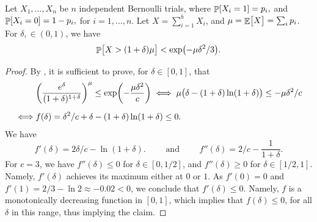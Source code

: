 \begin{fragment}{}
    \begin{lemma}
        Let $X_1, \ldots, X_n$ be $n$ independent Bernoulli trials, where
        \begin{math}
            \Prob{  X_i = 1 } =p_i,
        \end{math}
        and
        \begin{math}
            \Prob{  X_i = 0 } =1- p_i,
        \end{math}
        for $i=1,\ldots, n$.  Let $X = \sum_{i=1}^{b} X_i$, and
        $\mu = \mathop{\mathbb{E}}\!\left[ {\bigl. X} \right] = \sum_i p_i$.  For $\delta, \in (0,1)$,
        we have
        \begin{equation*}
            \Prob{ \bigl. X > (1+\delta)\mu } < \exp \pth{-\mu \delta^2 /
               3}.
        \end{equation*}
    \end{lemma}
\end{fragment}
\begin{proof}
    By , it is sufficient to prove, for
    $\delta\in [0,1]$, that
    \begin{align*}
      & \pth{ \frac{e^\delta}{(1+\delta)^{1+\delta}}}^\mu \leq
        \exp\pth{- \frac{\mu \delta^2}{c} }
        \iff
        \mu \bigl( \delta -(1+\delta) \ln(1+\delta) \bigr)
        \leq
        - \mu \delta^2/c
      \\[0.2cm]
      \iff
      &
        f(\delta) = \delta^2/c + \delta -(1+\delta) \ln(1+\delta)
        \leq 0.
    \end{align*}
    We have
    \begin{equation*}
        f'(\delta)
        = 2\delta/c  - \ln(1+\delta).
        \qquad\text{ and }\qquad%
        f''(\delta)
        = 2/c   - \frac{1}{1+\delta}.
    \end{equation*}
    For $c=3$, we have $f''(\delta) \leq 0$ for $\delta \in [0,1/2]$,
    and $f''(\delta) \geq 0$ for $\delta \in [1/2,1]$. Namely,
    $f'(\delta)$ achieves its maximum either at $0$ or $1$. As
    $f'(0) = 0$ and $f'(1) = 2/3 - \ln 2 \approx -0.02<0$, we conclude
    that $f'(\delta) \leq 0$. Namely, $f$ is a monotonically
    decreasing function in $[0,1]$, which implies that
    $f(\delta) \leq 0$, for all $\delta$ in this range, thus implying
    the claim.
\end{proof}



